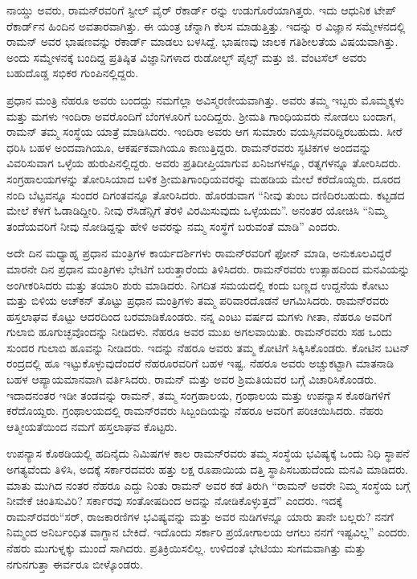ನಾಯ್ಡು ಅವರು, ರಾಮನ್‍ರವರಿಗೆ ಸ್ಟೀಲ್ ವೈರ್ ರೆಕಾರ್ಡ್ ರನ್ನು ಉಡುಗೊರೆಯಾಗಿತ್ತರು. ಇದು ಆಧುನಿಕ ಟೇಪ್ ರೆಕಾರ್ಡ್‌ನ ಹಿಂದಿನ ಅವತಾರವಾಗಿತ್ತು. ಈ ಯಂತ್ರ ಚೆನ್ನಾಗಿ ಕೆಲಸ ಮಾಡುತ್ತಿತ್ತು. ಇದನ್ನು ರ ವಿಜ್ಞಾನ ಸಮ್ಮೇಳನದಲ್ಲಿ ರಾಮನ್ ಅವರ ಭಾಷಣವನ್ನು ರೆಕಾರ್ಡ್ ಮಾಡಲು ಬಳಸಿದ್ದೆ. ಭಾಷಣವು ಜಾಲಕ ಗತಿಶೀಲತೆಯ ವಿಷಯವಾಗಿತ್ತು. ಅಂದು ಸಮ್ಮೇಳನಕ್ಕೆ ಬಂದಿದ್ದ ಪ್ರತಿಷ್ಠಿತ ವಿಜ್ಞಾನಿಗಳಾದ ರುಡೋಲ್ಭ್ ಪೈಲ್ಸ್ ಮತ್ತು ಜಿ. ವೆಂಟಸೆಲ್ ಅವರು ಬಹುದೊಡ್ಡ ಸಭಿಕರ ಗುಂಪಿನಲ್ಲಿದ್ದರು.



ಪ್ರಧಾನ ಮಂತ್ರಿ ನೆಹರೂ ಅವರು ಬಂದದ್ದು ನಮಗೆಲ್ಲಾ ಅವಿಸ್ಮರಣೀಯವಾಗಿತ್ತು. ಅವರು ತಮ್ಮ ಇಬ್ಬರು ಮೊಮ್ಮಕ್ಕಳು ಮತ್ತು ಮಗಳು ಇಂದಿರಾ ಅವರೊಂದಿಗೆ ಬೆಂಗಳೂರಿಗೆ ಬಂದಿದ್ದರು. ಶ‍್ರೀಮತಿ ಗಾಂಧಿಯವರು ನೋಡಲು ಬಂದಾಗ, ರಾಮನ್ ತಮ್ಮ ಸಂಸ್ಥೆಯ ಯಾತ್ರೆ ಮಾಡಿಸಿದರು. ಇಂದಿರಾ ಅವರು ಆಗ ಸುಮಾರು  ವಯಸ್ಸಿನವರಿದ್ದಿರಬಹುದು. ಸೀರೆ ಧರಿಸಿ ಬಹಳ ಅಂದವಾಗಿಯೂ, ಆಕರ್ಷಕವಾಗಿಯೂ ಕಾಣುತ್ತಿದ್ದರು. ರಾಮನ್‍ರವರು ಸ್ಫಟಿಕಗಳ ಅಂದವನ್ನು ವಿವರಿಸುವಾಗ ಒಳ್ಳೆಯ ಹುರುಪಿನಲ್ಲಿದ್ದರು. ಅವರು ಪ್ರತಿದೀಪ್ತಿಯಾಗುವ ಖನಿಜಗಳನ್ನೂ, ರತ್ನಗಳನ್ನೂ ತೋರಿಸಿದರು. ಸಂಗ್ರಹಾಲಯಗಳನ್ನು ತೋರಿಸಿಯಾದ ಬಳಿಕ ಶ‍್ರೀಮತಿ\break ಗಾಂಧಿಯವರನ್ನು ಮಹಡಿಯ ಮೇಲೆ ಕರೆದೊಯ್ದರು. ದೂರದ ನಂದಿ ಬೆಟ್ಟವನ್ನೂ ಸುಂದರ ದಿಗಂತವನ್ನೂ ತೋರಿಸಿದರು. ಹೊರಡುವಾಗ “ನೀವು ತುಂಬ ದಣಿದಿರಬಹುದು. ಕಟ್ಟಡದ ಮೇಲೆ ಕೆಳಗೆ ಓಡಾಡಿದ್ದೀರಿ. ನೀವು ರೆಸಿಡೆನ್ಸಿಗೆ ತೆರಳಿ ವಿರಮಿಸುವುದು ಒಳ್ಳೆಯದು”. ಅನಂತರ ಯೋಚಿಸಿ “ನಿಮ್ಮ ತಂದೆಯವರಿಗೆ ನೀವು ನೋಡಿದ್ದನ್ನು ಹೇಳಿ ಅವರನ್ನು ನಮ್ಮ ಸಂಸ್ಥೆಗೆ ಬರುವಂತೆ ಮಾಡಿ” ಎಂದರು.

ಅದೇ ದಿನ ಮಧ್ಯಾಹ್ನ ಪ್ರಧಾನ ಮಂತ್ರಿಗಳ ಕಾರ್ಯದರ್ಶಿಗಳು ರಾಮನ್‍ರವರಿಗೆ ಫೋನ್ ಮಾಡಿ, ಅನುಕೂಲವಿದ್ದರೆ ಮಾರನೇ ದಿನ ಪ್ರಧಾನ ಮಂತ್ರಿಗಳು ಭೇಟಿಗೆ ಬರುತ್ತಾರೆಂದು ತಿಳಿಸಿದರು. ರಾಮನ್‍ರವರು ಉತ್ಸಾಹದಿಂದ ಮನವಿಯನ್ನು ಅಂಗೀಕರಿಸಿದರು ಮತ್ತು ತಯಾರಿ ಶುರು ಮಾಡಿದರು. ನಿಗದಿತ ಸಮಯದಲ್ಲಿ ಕಂದು ಬಣ್ಣದ ಉದ್ದನೆಯ ಕೋಟು ಮತ್ತು ಬಿಳಿಯ ಅಚ್‍ಕನ್ ತೊಟ್ಟು ಪ್ರಧಾನ ಮಂತ್ರಿಗಳು ತಮ್ಮ ಪರಿವಾರದೊಡನೆ ಆಗಮಿಸಿದರು. ರಾಮನ್‍ರವರು ಹಸ್ತಲಾಘವ ಕೊಟ್ಟು ಆದರದಿಂದ ಬರಮಾಡಿಕೊಂಡರು. ನನ್ನ ಎಂಟು ವರ್ಷದ ಮಗಳು ಗೀತಾ, ನೆಹರೂ ಅವರಿಗೆ ಗುಲಾಬಿ ಹೂಗುಚ್ಛವೊಂದನ್ನು ನೀಡಿದಳು. ನೆಹರೂ ಅವರ ಮುಖ ಅಗಲವಾಯಿತು. ರಾಮನ್‍ರವರು ಸಹ ಒಂದು ಸುಂದರ ಗುಲಾಬಿ ಹೂವನ್ನು ನೀಡಿದರು. ಇದನ್ನು ನೆಹರೂ ಅವರು ತಮ್ಮ ಕೋಟಿಗೆ ಸಿಕ್ಕಿಸಿಕೊಂಡರು. ಕೋಟಿನ ಬಟನ್ ರಂದ್ರದಲ್ಲಿ ಹೂ ಇಟ್ಟುಕೊಳ್ಳುವುದೆಂದರೆ ನೆಹರೂರವರಿಗೆ ಬಹಳ ಇಷ್ಟ. ನೆಹರೂ ಅವರು ಅಚ್ಚುಕಟ್ಟಾಗಿ ಮಾತನಾಡಿ ಬಹಳ ಆಪ್ಯಾಯಮಾನ\-ವಾಗಿ ವರ್ತಿಸಿದರು. ರಾಮನ್ ಮತ್ತು ಅವರ ಶ್ರಿಮತಿಯವರ ಬಗ್ಗೆ ವಿಚಾರಿಸಿಕೊಂಡರು. ಇದಾದನಂತರ ಇಡೀ ತಂಡವನ್ನು ರಾಮನ್, ತಮ್ಮ ಸಂಗ್ರಹಾಲಯ, ಗ್ರಂಥಾಲಯ ಮತ್ತು ಉಪನ್ಯಾಸ ಕೊಠಡಿಗಳಿಗೆ ಕರೆದೊಯ್ದರು. ಗ್ರಂಥಾಲಯದಲ್ಲಿ ರಾಮನ್‍ರವರು ಸಿಬ್ಬಂದಿಯನ್ನು ನೆಹರೂ ಅವರಿಗೆ ಪರಿಚಯಿಸಿದರು. ನೆಹರು ಆತ್ಮೀಯತೆಯಿಂದ ನಮಗೆ ಹಸ್ತಲಾಘವ ಕೊಟ್ಟರು.

ಉಪನ್ಯಾಸ ಕೊಠಡಿಯಲ್ಲಿ ಹದಿನೈದು ನಿಮಿಷಗಳ ಕಾಲ ರಾಮನ್‍ರವರು ತಮ್ಮ ಸಂಸ್ಥೆಯ ಭವಿಷ್ಯಕ್ಕೆ ಒಂದು ನಿಧಿ ಸ್ಥಾಪನೆ ಅಗತ್ಯವೆಂದು ತಿಳಿಸಿ, ಅದಕ್ಕೆ ಸರ್ಕಾರದವರು ಹತ್ತು ಲಕ್ಷ ರೂಪಾಯಿಯ ದತ್ತಿ ಸ್ಥಾಪಿಸಬಹುದೆಂದು ಮನವಿ ಮಾಡಿದರು. ಮಾತು ಮುಗಿದ ನಂತರ ನೆಹರೂ ಎದ್ದು ನಿಂತು ರಾಮನ್ ಅವರ ಕಡೆ ತಿರುಗಿ \enginline{-} “ರಾಮನ್ ಅವರೇ ನಿಮ್ಮ ಸಂಸ್ಥೆಯ ಬಗ್ಗೆ ನೀವೇಕೆ ಚಿಂತಿಸುವಿರಿ? ಸರ್ಕಾರವು ಸಂತೋಷದಿಂದ ಅದನ್ನು ನೋಡಿಕೊಳ್ಳುತ್ತದೆ” ಎಂದರು. ಇದಕ್ಕೆ ರಾಮನ್‍ರವರು\enginline{-}\break “ಸರ್, ರಾಜಕಾರಣಿಗಳ ಭವಿಷ್ಯವನ್ನು ಮತ್ತು ಅವರ ನುಡಿಗಳನ್ನೂ ಯಾರು ತಾನೇ ಬಲ್ಲರು? ನನಗೆ ನಿಮ್ಮಂದ ಅನಿರ್ಬಂಧಿತ ವಾಗ್ದಾನ ಬೇಕಿದೆ. ಇದೊಂದು ಸರ್ಕಾರಿ ಪ್ರಯೋಗಾಲಯ ಆಗಲು ನನಗೆ ಇಷ್ಟವಿಲ್ಲ” ಎಂದರು. ನೆಹರು ಮುಗುಳ್ನಕ್ಕು ಮುಂದೆ ಸಾಗಿದರು. ಪ್ರತಿಕ್ರಿಯಿಸಲಿಲ್ಲ. ಉಳಿದಂತೆ ಭೇಟಿಯು ಸುಗಮವಾಗಿತ್ತು ಮತ್ತು ನಗುನಗುತ್ತಾ ಈರ್ವರೂ ಬೀಳ್ಕೊಂಡರು.


